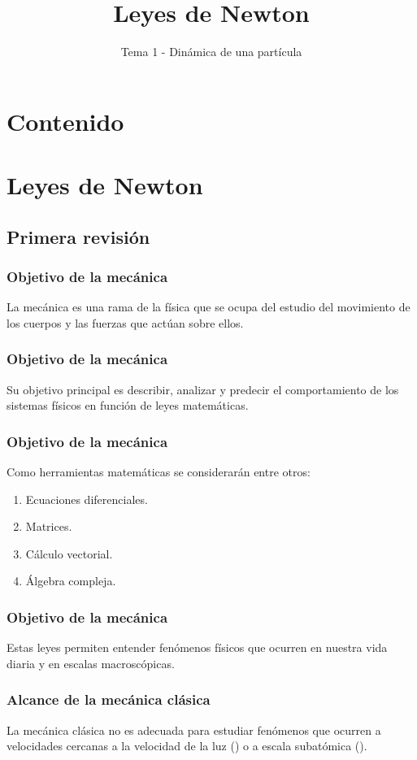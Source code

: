 \documentclass[12pt]{beamer}
\title{Leyes de Newton}
\subtitle{Tema 1 - Dinámica de una partícula}
\begin{document}
\fontsize{14}{14}\selectfont
{}
\maketitle

\section*{Contenido}

\section{Leyes de Newton}
\subsection{Primera revisión}

\begin{frame}
\frametitle{Objetivo de la mecánica}
La mecánica es una rama de la física que se ocupa del estudio del movimiento de los cuerpos y las fuerzas que actúan sobre ellos.
\end{frame}
\begin{frame}
\frametitle{Objetivo de la mecánica}
Su objetivo principal es describir, analizar y predecir el comportamiento de los sistemas físicos en función de leyes matemáticas.
\end{frame}
\begin{frame}
\frametitle{Objetivo de la mecánica}
Como herramientas matemáticas se considerarán entre otros:
\begin{enumerate}[<+->]
\item Ecuaciones diferenciales.
\item Matrices.
\item Cálculo vectorial.
\item Álgebra compleja.
\end{enumerate}
\end{frame}
\begin{frame}
\frametitle{Objetivo de la mecánica}
Estas leyes permiten entender fenómenos físicos que ocurren en nuestra vida diaria y en escalas macroscópicas.
\end{frame}
\begin{frame}
\frametitle{Alcance de la mecánica clásica}
La mecánica clásica no es adecuada para estudiar fenómenos que ocurren a velocidades cercanas a la velocidad de la luz () \pause o a escala subatómica ().
\end{frame}
\end{document}
